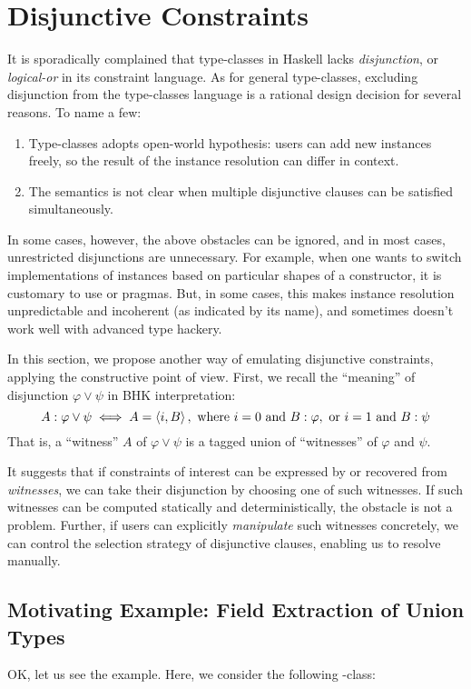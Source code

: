 \documentclass[demotion-paper.tex]{subfiles}
\begin{document}
\section{Disjunctive Constraints}
\label{sec:disj}
It is sporadically complained that type-classes in Haskell lacks \emph{disjunction}, or \emph{logical-or} in its constraint language.
As for general type-classes, excluding disjunction from the type-classes language is a rational design decision for several reasons.
To name a few:
\begin{enumerate}
  \item Type-classes adopts open-world hypothesis: users can add new instances freely, so the result of the instance resolution can differ in context.
  \label{item:openness}
  \item The semantics is not clear when multiple disjunctive clauses can be satisfied simultaneously.
  \label{item:arb-choice}
\end{enumerate}
In some cases, however, the above obstacles can be ignored, and in most cases, unrestricted disjunctions are unnecessary.
For example, when one wants to switch implementations of instances based on particular shapes of a constructor, it is customary to use  or  pragmas.
But, in some cases, this makes instance resolution unpredictable and incoherent (as indicated by its name), and sometimes doesn't work well with advanced type hackery.

In this section, we propose another way of emulating disjunctive constraints, applying the constructive point of view.
First, we recall the ``meaning'' of disjunction $\varphi \vee \psi$ in BHK interpretation:
\[
  A: \varphi \vee \psi \iff A = \braket{i, B},\text{ where }
  i = 0 \text{ and } B: \varphi, \text{ or }
  i = 1 \text{ and } B: \psi
\]
That is, a ``witness'' $A$ of $\varphi \vee \psi$ is a tagged union of ``witnesses'' of $\varphi$ and $\psi$.

It suggests that if constraints of interest can be expressed by or recovered from \emph{witnesses}, we can take their disjunction by choosing one of such witnesses.
If such witnesses can be computed statically and deterministically, the obstacle  is not a problem.
Further, if users can explicitly \emph{manipulate} such witnesses concretely, we can control the selection strategy of disjunctive clauses, enabling us to resolve  manually.

\subsection{Motivating Example: Field Extraction of Union Types}
OK, let us see the example.
Here, we consider the following -class:
\end{document}
